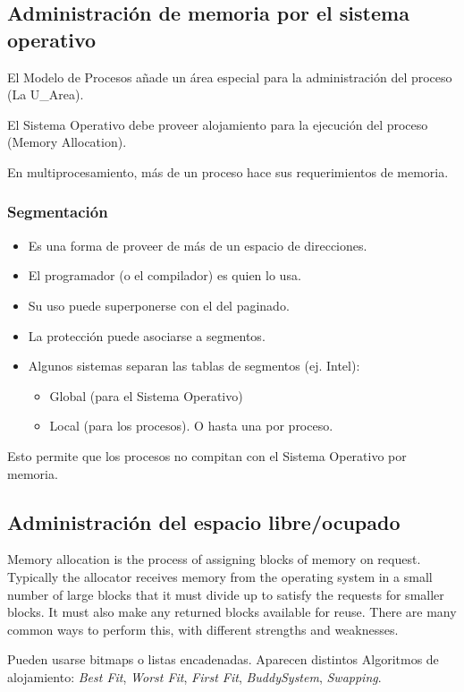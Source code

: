 \documentclass[a4paper, twoside]{article}
\begin{document}
\subsection{Administración de memoria por el sistema operativo}
El Modelo de Procesos añade un área especial para la administración del proceso (La U\_Area).

El Sistema Operativo debe proveer alojamiento para la ejecución del proceso (Memory Allocation).

En multiprocesamiento, más de un proceso hace sus requerimientos de memoria.

\subsubsection{Segmentación}
\begin{itemize}
	\item Es una forma de proveer de más de un espacio de direcciones.
	\item El programador (o el compilador) es quien lo usa.
	\item Su uso puede superponerse con el del paginado.
	\item La protección puede asociarse a segmentos.
	\item Algunos sistemas separan las tablas de segmentos (ej. Intel):
	\begin{itemize}
		\item Global (para el Sistema Operativo)
		\item Local (para los procesos). O hasta una por proceso.
	\end{itemize}
\end{itemize}
Esto permite que los procesos no compitan con el Sistema Operativo por memoria.

\subsection{Administración del espacio libre/ocupado}
Memory allocation is the process of assigning blocks of memory on request. Typically the allocator receives memory from the operating system in a small number of large blocks that it must divide up to satisfy the requests for smaller blocks. It must also make any returned blocks available for reuse. There are many common ways to perform this, with different strengths and weaknesses.

Pueden usarse bitmaps o listas encadenadas. Aparecen distintos Algoritmos de alojamiento: \emph{Best Fit}, \emph{Worst Fit}, \emph{First Fit}, \emph{BuddySystem}, \emph{Swapping}.
\end{document}
